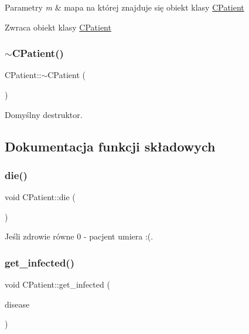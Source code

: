 \begin{DoxyParams}{Parametry}
{\em m} & mapa na której znajduje się obiekt klasy \mbox{\hyperlink{class_c_patient}{C\+Patient}} \\
\hline
\end{DoxyParams}
\begin{DoxyReturn}{Zwraca}
obiekt klasy \mbox{\hyperlink{class_c_patient}{C\+Patient}} 
\end{DoxyReturn}
\mbox{\label{class_c_patient_ae744d8c6efd9d57da6592e8f9c272d3f}} 
\subsubsection{\texorpdfstring{$\sim$\+C\+Patient()}{~CPatient()}}
{\footnotesize\ttfamily C\+Patient\+::$\sim$\+C\+Patient (\begin{DoxyParamCaption}{ }\end{DoxyParamCaption})}



Domyślny destruktor. 



\subsection{Dokumentacja funkcji składowych}
\mbox{\label{class_c_patient_a4d911cc3aa072d7e88abcb08c2c5d18d}} 
\subsubsection{\texorpdfstring{die()}{die()}}
{\footnotesize\ttfamily void C\+Patient\+::die (\begin{DoxyParamCaption}{ }\end{DoxyParamCaption})}



Jeśli zdrowie równe 0 -\/ pacjent umiera \+:(. 

\mbox{\label{class_c_patient_abc2af17d253627978b229cc9dcec5e58}} 
\subsubsection{\texorpdfstring{get\+\_\+infected()}{get\_infected()}}
{\footnotesize\ttfamily void C\+Patient\+::get\+\_\+infected (\begin{DoxyParamCaption}\item[{\mbox{\hyperlink{class_c_disease}{C\+Disease}} $\ast$}]{disease }\end{DoxyParamCaption})}



